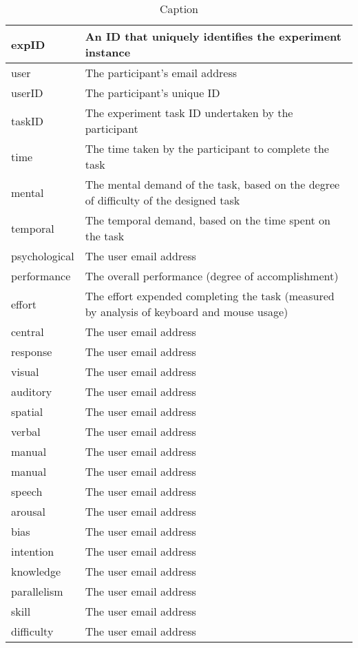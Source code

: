 \begin{table}[]
\centering
\begin{tabular}{l|p{8cm}}
 expID & An ID that uniquely identifies the experiment instance \\ \hline
 user & The participant's email address \\ \hline
 userID & The participant's unique ID \\ \hline
 taskID & The experiment task ID undertaken by the participant \\ \hline
 time & The time taken by the participant to complete the task \\ \hline
 mental & The mental demand of the task, based on the degree of difficulty of the designed task \\ \hline
 temporal & The temporal demand, based on the time spent on the task\\ \hline
 psychological & The user email address \\ \hline
 performance & The overall performance (degree of accomplishment) \\ \hline
 effort & The effort expended completing the task (measured by analysis of keyboard and mouse usage) \\ \hline
 central & The user email address \\ \hline
 response & The user email address \\ \hline
 visual & The user email address \\ \hline
 auditory & The user email address \\ \hline
 spatial & The user email address \\ \hline
 verbal & The user email address \\ \hline
 manual & The user email address \\ \hline
 manual & The user email address \\ \hline
 speech & The user email address \\ \hline
 arousal & The user email address \\ \hline
 bias & The user email address \\ \hline
 intention & The user email address \\ \hline
 knowledge & The user email address \\ \hline
 parallelism & The user email address \\ \hline
 skill & The user email address \\ \hline
 difficulty & The user email address \\ \hline
 
 
\end{tabular}
\caption{Caption}
\label{tab:my_label}
\end{table}






